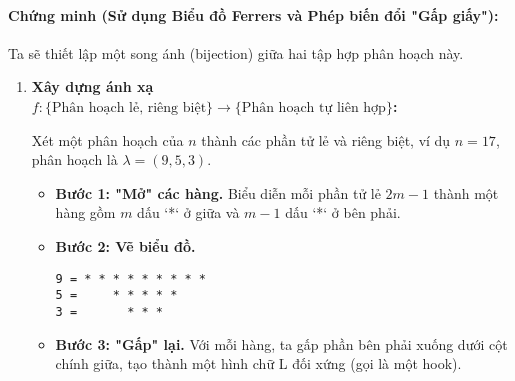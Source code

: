 \documentclass[a4paper,12pt]{article}
\begin{document}
\paragraph{Chứng minh (Sử dụng Biểu đồ Ferrers và Phép biến đổi "Gấp giấy"):}
Ta sẽ thiết lập một song ánh (bijection) giữa hai tập hợp phân hoạch này.

\begin{enumerate}
    \item \textbf{Xây dựng ánh xạ $f: \{\text{Phân hoạch lẻ, riêng biệt}\} \to \{\text{Phân hoạch tự liên hợp}\}$:}
    
    Xét một phân hoạch của $n$ thành các phần tử lẻ và riêng biệt, ví dụ $n=17$, phân hoạch là $\lambda = (9, 5, 3)$.
    \begin{itemize}
        \item \textbf{Bước 1: "Mở" các hàng.} Biểu diễn mỗi phần tử lẻ $2m-1$ thành một hàng gồm $m$ dấu `*` ở giữa và $m-1$ dấu `*` ở bên phải.
        \item \textbf{Bước 2: Vẽ biểu đồ.}
        \begin{center}
        \begin{lstlisting}[basicstyle=\ttfamily, numbers=none]
9 = * * * * * * * * *
5 =     * * * * *
3 =       * * *
        \end{lstlisting}
        \end{center}
        \item \textbf{Bước 3: "Gấp" lại.} Với mỗi hàng, ta gấp phần bên phải xuống dưới cột chính giữa, tạo thành một hình chữ L đối xứng (gọi là một hook).
        \begin{center}
        \end{center}

\end{itemize}
\end{enumerate}
\end{document}
